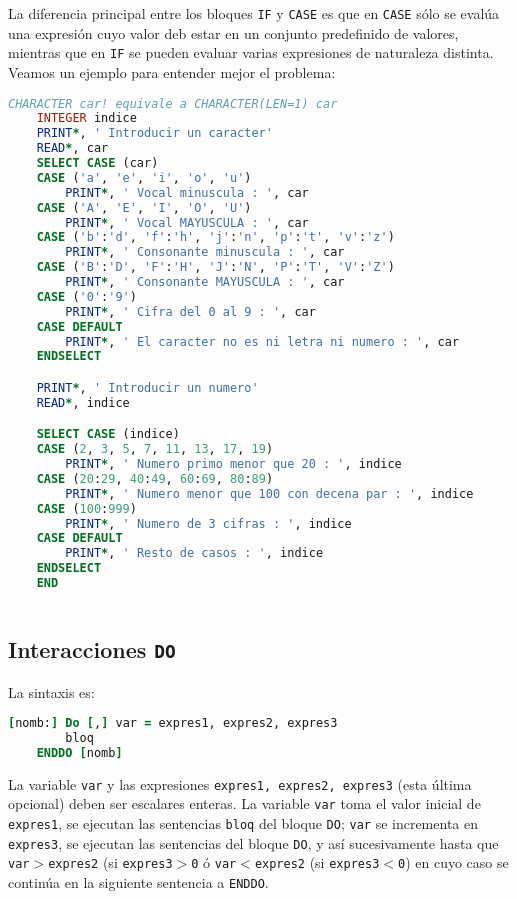 La diferencia principal entre los bloques {\tt IF} y {\tt CASE} es que en {\tt CASE} sólo se evalúa una expresión cuyo valor deb estar en un conjunto predefinido de valores, mientras que en {\tt IF} se pueden evaluar varias expresiones de naturaleza distinta. Veamos un ejemplo para entender mejor el problema:

\begin{lstlisting}[language=Fortran]
	CHARACTER car! equivale a CHARACTER(LEN=1) car
	INTEGER indice
	PRINT*, ' Introducir un caracter'
	READ*, car
	SELECT CASE (car)
	CASE ('a', 'e', 'i', 'o', 'u')
		PRINT*, ' Vocal minuscula : ', car
	CASE ('A', 'E', 'I', 'O', 'U')
		PRINT*, ' Vocal MAYUSCULA : ', car
	CASE ('b':'d', 'f':'h', 'j':'n', 'p':'t', 'v':'z')
		PRINT*, ' Consonante minuscula : ', car
	CASE ('B':'D', 'F':'H', 'J':'N', 'P':'T', 'V':'Z')
		PRINT*, ' Consonante MAYUSCULA : ', car
	CASE ('0':'9')
		PRINT*, ' Cifra del 0 al 9 : ', car
	CASE DEFAULT
		PRINT*, ' El caracter no es ni letra ni numero : ', car
	ENDSELECT

	PRINT*, ' Introducir un numero'
	READ*, indice

	SELECT CASE (indice)
	CASE (2, 3, 5, 7, 11, 13, 17, 19)
		PRINT*, ' Numero primo menor que 20 : ', indice
	CASE (20:29, 40:49, 60:69, 80:89)
		PRINT*, ' Numero menor que 100 con decena par : ', indice
	CASE (100:999)
		PRINT*, ' Numero de 3 cifras : ', indice
	CASE DEFAULT
		PRINT*, ' Resto de casos : ', indice
	ENDSELECT
	END
	
\end{lstlisting}

\subsection{Interacciones {\tt DO}}

La sintaxis es:

\begin{lstlisting}[language=Fortran]
	[nomb:] Do [,] var = expres1, expres2, expres3 
		bloq
	ENDDO [nomb]
\end{lstlisting}

La variable {\tt var} y las expresiones {\tt expres1, expres2, expres3} (esta última opcional) deben ser escalares enteras. La variable {\tt var} toma el valor inicial de {\tt expres1}, se ejecutan las sentencias {\tt bloq} del bloque {\tt DO}; {\tt var} se incrementa en {\tt expres3}, se ejecutan las sentencias del bloque {\tt DO}, y así sucesivamente hasta que {\tt var$>$expres2} (si {\tt expres3$>$0} ó  {\tt var$<$expres2} (si {\tt expres3$<$0}) en cuyo caso se continúa en la siguiente sentencia a {\tt ENDDO}. \\

